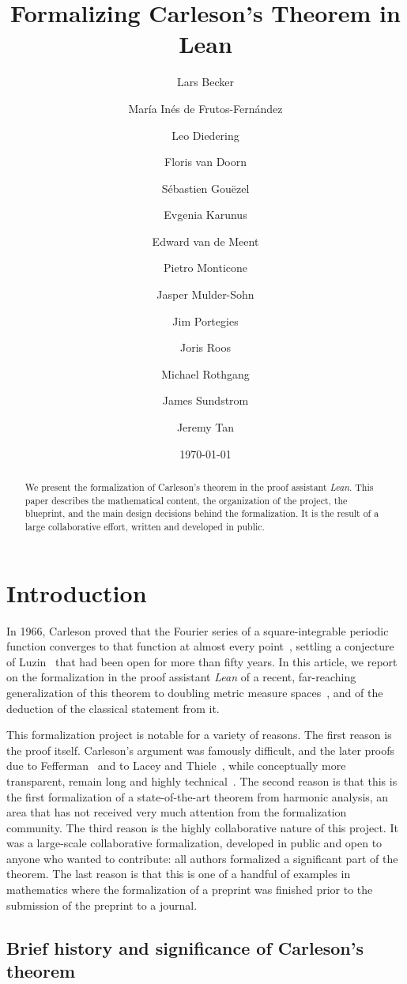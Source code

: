 \documentclass[12pt]{amsart}
\title{\textbf{Formalizing Carleson's Theorem in Lean}}
\author[Becker et al.]{Lars Becker}
\author[]{Mar\'ia Inés de Frutos-Fernández}
\author[]{Leo Diedering}
\author[]{Floris van Doorn}
\author[]{Sébastien Gouëzel}
\author[]{Evgenia Karunus}
\author[]{Edward van de Meent}
\author[]{Pietro Monticone}
\author[]{Jasper Mulder-Sohn}
\author[]{Jim Portegies}
\author[]{Joris Roos}
\author[]{Michael Rothgang}
\author[]{James Sundstrom}
\author[]{Jeremy Tan}
\date{\today}
\theoremstyle{definition}
\theoremstyle{plain}
\begin{document}
\begin{abstract}
We present the formalization of Carleson's theorem in the proof assistant \emph{Lean}.
This paper describes the mathematical content, the organization of the project, the blueprint,
and the main design decisions behind the formalization. It is the result of a large
collaborative effort, written and developed in public.
\end{abstract}

\maketitle

\tableofcontents

\section{Introduction}\label{sec:intro}

In 1966, Carleson proved that the Fourier series of a square-integrable periodic function
converges to that function at almost every point~\cite{carleson},
settling a conjecture of Luzin~\cite{Luzin13} that had been open for more than fifty years.
In this article, we report on the formalization in the proof assistant \emph{Lean}
of a recent, far-reaching generalization of this theorem to doubling metric measure
spaces~\cite{ThieleCarlesonPreprint}, and of the deduction of the classical statement from it.

This formalization project is notable for a variety of reasons.
The first reason is the proof itself.
Carleson's argument was famously difficult, and the later proofs due to
Fefferman~\cite{fefferman} and to Lacey and Thiele~\cite{lacey-thiele},
while conceptually more transparent, remain long and highly technical~\cite[p. 170]{MR3334208}.
The second reason is that this is the first formalization of a state-of-the-art theorem from
harmonic analysis, an area that has not received very much attention from the formalization
community.
The third reason is the highly collaborative nature of this project.
It was a large-scale collaborative formalization,
developed in public and open to anyone who wanted to contribute:
all authors formalized a significant part of the theorem.
The last reason is that this is one of a handful of examples in mathematics where the formalization
of a preprint was finished prior to the submission of the preprint to a journal.

\subsection{Brief history and significance of Carleson's theorem}\label{subsec:history}
\end{document}
